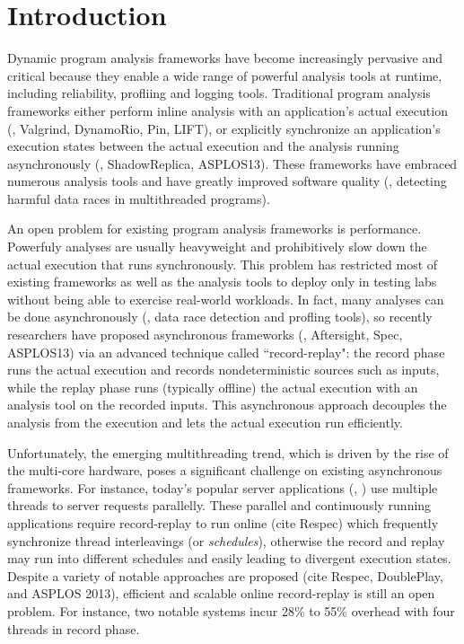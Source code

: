 \section{Introduction} \label{sec:intro}



Dynamic program analysis frameworks have become increasingly pervasive and 
critical because they enable a wide range of powerful analysis tools at 
runtime, including reliability, profliing and logging tools. Traditional 
program analysis frameworks either perform inline analysis with an 
application's actual execution (\eg, Valgrind, DynamoRio, Pin, LIFT), or 
explicitly synchronize an application's execution states between the actual 
execution and the analysis running asynchronously (\eg, ShadowReplica, 
ASPLOS13). These frameworks have embraced numerous analysis tools and have 
greatly improved software quality (\eg, detecting harmful data races in 
multithreaded programs).


An open problem for existing program analysis frameworks is performance.
Powerfuly analyses are usually heavyweight and prohibitively slow down the 
actual execution that runs synchronously. This problem has restricted most of 
existing frameworks as well as the analysis tools to deploy only in testing 
labs without being able to exercise real-world workloads. In fact, many 
analyses can be done asynchronously (\eg, data race detection and profling 
tools), so recently researchers have proposed asynchronous frameworks (\eg, 
Aftersight, Spec, ASPLOS13) via an advanced technique called ``record-replay": 
the record phase runs the actual execution and records nondeterministic sources 
such as inputs, while the replay phase runs (typically offline) the actual 
execution with an analysis tool on the recorded inputs. This asynchronous 
approach decouples the analysis from the execution and lets the actual 
execution run efficiently.


Unfortunately, the emerging multithreading trend, which is driven by the rise 
of the multi-core hardware, poses a significant challenge on existing 
asynchronous frameworks. For instance, today's popular server applications 
(\eg, \apache) use multiple threads to server requests parallelly. These 
parallel and continuously running applications require record-replay to run 
online (cite Respec) which frequently synchronize thread interleavings (or 
\emph{schedules}), otherwise the record and replay may run into different 
schedules and easily leading to divergent execution states. Despite a variety 
of notable approaches are proposed (cite Respec, DoublePlay, and ASPLOS 2013), 
efficient and scalable online record-replay is still an open problem. For 
instance, two notable systems incur 28\% to 55\% overhead with four threads in 
record phase.

